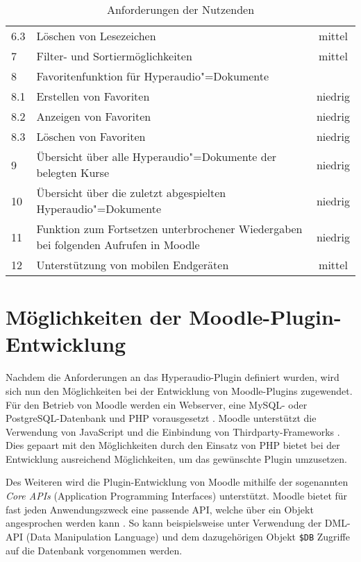 \begin{table}[!ht]
\begin{tabularx}{\textwidth}{lXc}
   	6.3 & \hspace*{0.5cm} Löschen von Lesezeichen & mittel\\
   	7 & Filter- und Sortiermöglichkeiten & mittel\\
    8 & Favoritenfunktion für Hyperaudio"=Dokumente & \\
    8.1 & \hspace*{0.5cm} Erstellen von Favoriten & niedrig\\
    8.2 & \hspace*{0.5cm} Anzeigen von Favoriten & niedrig\\
    8.3 & \hspace*{0.5cm} Löschen von Favoriten & niedrig\\    
    9 & Übersicht über alle Hyperaudio"=Dokumente der belegten Kurse & niedrig\\
    10 & Übersicht über die zuletzt abgespielten Hyperaudio"=Dokumente & niedrig\\
    11 &  Funktion zum Fortsetzen unterbrochener Wiedergaben bei folgenden Aufrufen in Moodle & niedrig\\
    12 & Unterstützung von mobilen Endgeräten & mittel\\
    \hline
\end{tabularx}
\caption{Anforderungen der Nutzenden}
\label{tab:AnforderungenNutzenden}
\end{table}

\section{Möglichkeiten der Moodle-Plugin-Entwicklung}
Nachdem die Anforderungen an das Hyperaudio-Plugin definiert wurden, wird sich nun den Möglichkeiten bei der Entwicklung von Moodle-Plugins zugewendet. Für den Betrieb von Moodle werden ein Webserver, eine MySQL- oder PostgreSQL-Datenbank und PHP vorausgesetzt . Moodle unterstützt die Verwendung von JavaScript und die Einbindung von Thirdparty-Frameworks \citep{wild2017moodle}. Dies gepaart mit den Möglichkeiten durch den Einsatz von PHP bietet bei der Entwicklung ausreichend Möglichkeiten, um das gewünschte Plugin umzusetzen.

\pagebreak

Des Weiteren wird die Plugin-Entwicklung von Moodle mithilfe der sogenannten \textit{Core APIs} (Application Programming Interfaces) unterstützt. Moodle bietet für fast jeden Anwendungszweck eine passende API, welche über ein Objekt angesprochen werden kann \citep{wild2017moodle}. So kann beispielsweise unter Verwendung der DML-API (Data Manipulation Language) und dem dazugehörigen Objekt \texttt{\$DB} Zugriffe auf die Datenbank vorgenommen werden.

